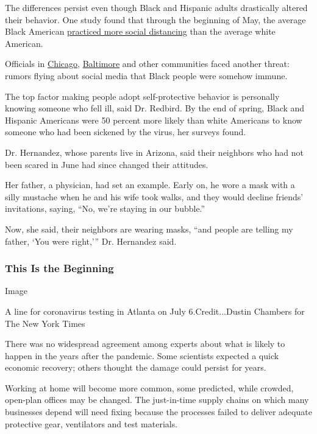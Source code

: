 The differences persist even though Black and Hispanic adults
drastically altered their behavior. One study found that through the
beginning of May, the average Black American
\href{https://www.medrxiv.org/content/10.1101/2020.06.04.20119131v1}{practiced
more social distancing} than the average white American.

Officials in
\href{https://blockclubchicago.org/2020/04/07/black-people-are-not-immune-to-coronavirus-debunking-deadly-social-media-myths/}{Chicago},
\href{https://www.baltimoresun.com/coronavirus/bs-md-baltimore-coronavirus-black-messaging-testing-20200414-cgqbwz6cmffabel364ixfktlje-story.html}{Baltimore}
and other communities faced another threat: rumors flying about social
media that Black people were somehow immune.

The top factor making people adopt self-protective behavior is
personally knowing someone who fell ill, said Dr. Redbird. By the end of
spring, Black and Hispanic Americans were 50 percent more likely than
white Americans to know someone who had been sickened by the virus, her
surveys found.

Dr. Hernandez, whose parents live in Arizona, said their neighbors who
had not been scared in June had since changed their attitudes.

Her father, a physician, had set an example. Early on, he wore a mask
with a silly mustache when he and his wife took walks, and they would
decline friends' invitations, saying, ``No, we're staying in our
bubble.''

Now, she said, their neighbors are wearing masks, ``and people are
telling my father, `You were right,''' Dr. Hernandez said.

\hypertarget{this-is-the-beginning}{%
\subsubsection{This Is the Beginning}\label{this-is-the-beginning}}

Image

A line for coronavirus testing in Atlanta on July 6.Credit...Dustin
Chambers for The New York Times

There was no widespread agreement among experts about what is likely to
happen in the years after the pandemic. Some scientists expected a quick
economic recovery; others thought the damage could persist for years.

Working at home will become more common, some predicted, while crowded,
open-plan offices may be changed. The just-in-time supply chains on
which many businesses depend will need fixing because the processes
failed to deliver adequate protective gear, ventilators and test
materials.


